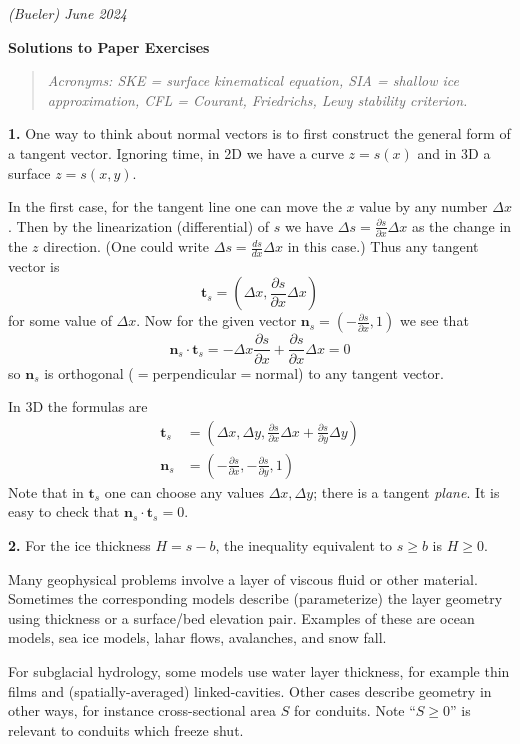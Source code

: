 \documentclass[12pt]{amsart}
\newcommand{\bn}{\mathbf{n}}
\newcommand{\bt}{\mathbf{t}}
\newcommand{\prob}[1]{\bigskip\noindent\textbf{#1.}\quad }
\begin{document}
\scriptsize \hfill \emph{(Bueler) June 2024}
\normalsize\medskip

\Large\centerline{\textbf{Solutions to Paper Exercises}}

\normalsize
\medskip
\begin{quote}
\emph{Acronyms: SKE = surface kinematical equation, SIA = shallow ice approximation, CFL = Courant, Friedrichs, Lewy stability criterion.}
\end{quote}

\prob{1}  One way to think about normal vectors is to first construct the general form of a tangent vector.  Ignoring time, in 2D we have a curve $z=s(x)$ and in 3D a surface $z=s(x,y)$.

In the first case, for the tangent line one can move the $x$ value by any number $\Delta x$.  Then by the linearization (differential) of $s$ we have $\Delta s= \frac{\partial s}{\partial x} \Delta x$ as the change in the $z$ direction.  (One could write $\Delta s= \frac{ds}{dx} \Delta x$ in this case.)  Thus any tangent vector is
	$$\bt_s = \left(\Delta x, \frac{\partial s}{\partial x} \Delta x\right)$$
for some value of $\Delta x$.  Now for the given vector $\bn_s = (-\frac{\partial s}{\partial x},1)$ we see that
	$$\bn_s \cdot \bt_s = -\Delta x \frac{\partial s}{\partial x} + \frac{\partial s}{\partial x} \Delta x = 0$$
so $\bn_s$ is orthogonal ($=$perpendicular$=$normal) to any tangent vector.

In 3D the formulas are
\begin{align*}
\bt_s &= \left(\Delta x, \Delta y, \frac{\partial s}{\partial x} \Delta x + \frac{\partial s}{\partial y} \Delta y\right) \\
\bn_s &= \left(-\frac{\partial s}{\partial x},-\frac{\partial s}{\partial y},1\right)
\end{align*}
Note that in $\bt_s$ one can choose any values $\Delta x,\Delta y$; there is a tangent \emph{plane}.  It is easy to check that $\bn_s \cdot \bt_s = 0$.


\prob{2}  For the ice thickness $H=s-b$, the inequality equivalent to $s\ge b$ is $H\ge 0$.

Many geophysical problems involve a layer of viscous fluid or other material.  Sometimes the corresponding models describe (parameterize) the layer geometry using thickness or a surface/bed elevation pair.  Examples of these are ocean models, sea ice models, lahar flows, avalanches, and snow fall.

For subglacial hydrology, some models use water layer thickness, for example thin films and (spatially-averaged) linked-cavities.  Other cases describe geometry in other ways, for instance cross-sectional area $S$ for conduits.  Note ``$S\ge 0$'' is relevant to conduits which freeze shut.
\end{document}
